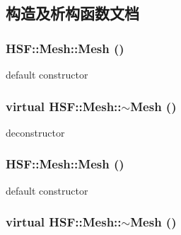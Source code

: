 \subsection{构造及析构函数文档}
\hypertarget{classHSF_1_1Mesh_acbd942f68387a832b8f7d5927db54eea}{
\subsubsection[{Mesh}]{\setlength{\rightskip}{0pt plus 5cm}HSF::Mesh::Mesh ()}}
\label{classHSF_1_1Mesh_acbd942f68387a832b8f7d5927db54eea}


default constructor \hypertarget{classHSF_1_1Mesh_a3920b19d7969a8bb5d1eb505ec9f43b4}{
\subsubsection[{$\sim$Mesh}]{\setlength{\rightskip}{0pt plus 5cm}virtual HSF::Mesh::$\sim$Mesh ()}}
\label{classHSF_1_1Mesh_a3920b19d7969a8bb5d1eb505ec9f43b4}


deconstructor \hypertarget{classHSF_1_1Mesh_acbd942f68387a832b8f7d5927db54eea}{
\subsubsection[{Mesh}]{\setlength{\rightskip}{0pt plus 5cm}HSF::Mesh::Mesh ()}}
\label{classHSF_1_1Mesh_acbd942f68387a832b8f7d5927db54eea}


default constructor \hypertarget{classHSF_1_1Mesh_a3920b19d7969a8bb5d1eb505ec9f43b4}{
\subsubsection[{$\sim$Mesh}]{\setlength{\rightskip}{0pt plus 5cm}virtual HSF::Mesh::$\sim$Mesh ()}}
\label{classHSF_1_1Mesh_a3920b19d7969a8bb5d1eb505ec9f43b4}


